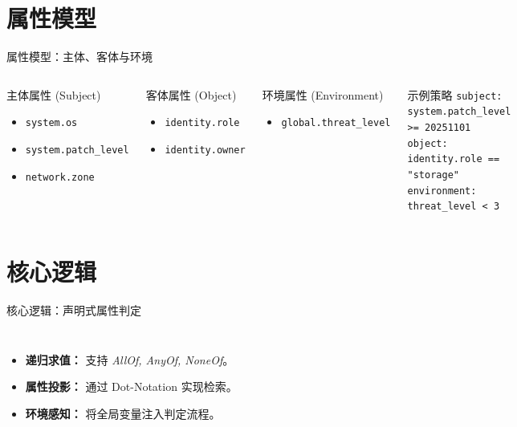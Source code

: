 \documentclass[aspectratio=169, 10pt]{beamer}
\begin{document}
\section{属性模型}
\begin{frame}{属性模型：主体、客体与环境}
\begin{columns}
\begin{block}{主体属性 (Subject)}
\begin{itemize}
    \item \texttt{system.os}
    \item \texttt{system.patch\_level}
    \item \texttt{network.zone}
\end{itemize}
\end{block}
\begin{block}{客体属性 (Object)}
\begin{itemize}
    \item \texttt{identity.role}
    \item \texttt{identity.owner}
\end{itemize}
\end{block}
\begin{block}{环境属性 (Environment)}
\begin{itemize}
    \item \texttt{global.threat\_level}
\end{itemize}
\end{block}
\vspace{1em}
\begin{exampleblock}{示例策略}
\tiny
\texttt{subject: system.patch\_level >= 20251101}\\
\texttt{object: identity.role == "storage"}\\
\texttt{environment: threat\_level < 3}
\end{exampleblock}
\end{columns}
\end{frame}

\section{核心逻辑}
\begin{frame}[fragile]{核心逻辑：声明式属性判定}
\begin{columns}

\begin{itemize}
    \item \textbf{递归求值：} 支持 \textit{AllOf, AnyOf, NoneOf}。
    \item \textbf{属性投影：} 通过 Dot-Notation 实现检索。
    \item \textbf{环境感知：} 将全局变量注入判定流程。
\end{itemize}
\end{columns}
\end{frame}
\end{document}
